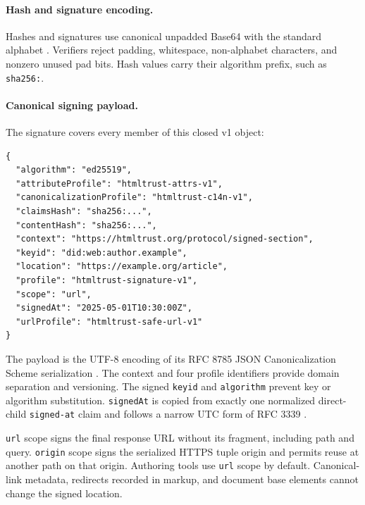 \documentclass{article}
\begin{document}
\paragraph{Hash and signature encoding.} Hashes and signatures use canonical unpadded Base64 with the standard alphabet \cite{Base64}. Verifiers reject padding, whitespace, non-alphabet characters, and nonzero unused pad bits. Hash values carry their algorithm prefix, such as \texttt{sha256:}.

\paragraph{Canonical signing payload.} The signature covers every member of this closed v1 object:
\begin{lstlisting}[basicstyle=\ttfamily\scriptsize]
{
  "algorithm": "ed25519",
  "attributeProfile": "htmltrust-attrs-v1",
  "canonicalizationProfile": "htmltrust-c14n-v1",
  "claimsHash": "sha256:...",
  "contentHash": "sha256:...",
  "context": "https://htmltrust.org/protocol/signed-section",
  "keyid": "did:web:author.example",
  "location": "https://example.org/article",
  "profile": "htmltrust-signature-v1",
  "scope": "url",
  "signedAt": "2025-05-01T10:30:00Z",
  "urlProfile": "htmltrust-safe-url-v1"
}
\end{lstlisting}
The payload is the UTF-8 encoding of its RFC 8785 JSON Canonicalization Scheme serialization \cite{JCS}. The context and four profile identifiers provide domain separation and versioning. The signed \texttt{keyid} and \texttt{algorithm} prevent key or algorithm substitution. \texttt{signedAt} is copied from exactly one normalized direct-child \texttt{signed-at} claim and follows a narrow UTC form of RFC 3339 \cite{RFC3339}.

\texttt{url} scope signs the final response URL without its fragment, including path and query. \texttt{origin} scope signs the serialized HTTPS tuple origin \cite{WebOrigin} and permits reuse at another path on that origin. Authoring tools use \texttt{url} scope by default. Canonical-link metadata, redirects recorded in markup, and document base elements cannot change the signed location.
\end{document}
